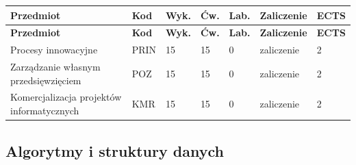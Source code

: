 \documentclass[12pt,a4paper]{article}
\newcommand{\thdrule}{\noalign{\global\setlength{\extrarowheight}{0pt}}}
\newcommand{\thdend}{\noalign{\global\setlength{\extrarowheight}{4pt}}}
\begin{document}
{\scriptsize
\begin{longtable}{m{5.5cm}m{0.8cm}m{1cm}m{1cm}m{1cm}m{1.7cm}m{0.7cm}}
\thdrule\toprule
\rowcolor{pjatkRed}
{\color{white}\footnotesize\textbf{\vphantom{Ag}Przedmiot}} & {\color{white}\footnotesize\textbf{\vphantom{Ag}Kod}} & {\color{white}\footnotesize\textbf{\vphantom{Ag}Wyk.}} & {\color{white}\footnotesize\textbf{\vphantom{Ag}Ćw.}} & {\color{white}\footnotesize\textbf{\vphantom{Ag}Lab.}} & {\color{white}\footnotesize\textbf{\vphantom{Ag}Zaliczenie}} & {\color{white}\footnotesize\textbf{\vphantom{Ag}ECTS}} \\
\midrule\thdend
\endfirsthead
\thdrule\toprule
\rowcolor{pjatkRed}
{\color{white}\footnotesize\textbf{\vphantom{Ag}Przedmiot}} & {\color{white}\footnotesize\textbf{\vphantom{Ag}Kod}} & {\color{white}\footnotesize\textbf{\vphantom{Ag}Wyk.}} & {\color{white}\footnotesize\textbf{\vphantom{Ag}Ćw.}} & {\color{white}\footnotesize\textbf{\vphantom{Ag}Lab.}} & {\color{white}\footnotesize\textbf{\vphantom{Ag}Zaliczenie}} & {\color{white}\footnotesize\textbf{\vphantom{Ag}ECTS}} \\
\midrule\thdend
\endhead
\rowcolor{tableRowLight} Procesy innowacyjne & PRIN & 15 & 15 & 0 & {\scriptsize zaliczenie} & 2 \\
\rowcolor{tableRowAlt} Zarządzanie własnym przedsięwzięciem & POZ & 15 & 15 & 0 & {\scriptsize zaliczenie} & 2 \\
\rowcolor{tableRowLight} Komercjalizacja projektów informatycznych & KMR & 15 & 15 & 0 & {\scriptsize zaliczenie} & 2 \\
\bottomrule
\end{longtable}}

\subsection*{Algorytmy i struktury danych}
\end{document}
